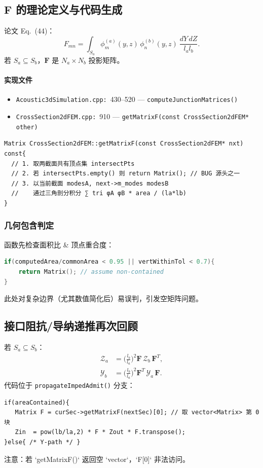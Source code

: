 \documentclass{ctexart}
\begin{document}
\subsection{$\mathbf F$ 的理论定义与代码生成}
论文 Eq.~(44)：
\[F_{mn}=\int_{S_a}\phi_m^{(a)}(y,z)\,\phi_n^{(b)}(y,z)\ \frac{dY\,dZ}{l_a l_b}.
\]
若 $S_a\subseteq S_b$，$\mathbf F$ 是 $N_a\times N_b$ 投影矩阵。

\paragraph{实现文件}
\begin{itemize}
  \item \texttt{Acoustic3dSimulation.cpp:}~430--520 — \texttt{computeJunctionMatrices()}
  \item \texttt{CrossSection2dFEM.cpp:}~910 — \texttt{getMatrixF(const CrossSection2dFEM* other)}
\end{itemize}

\begin{lstlisting}[caption={getMatrixF 核心片段},label={lst:Fcompute}]
Matrix CrossSection2dFEM::getMatrixF(const CrossSection2dFEM* nxt) const{
  // 1. 取两截面共有顶点集 intersectPts
  // 2. 若 intersectPts.empty() 则 return Matrix(); // BUG 源头之一
  // 3. 以当前截面 modesA, next->m_modes modesB
  //    通过三角剖分积分 ∑ tri φA φB * area / (la*lb)
}
\end{lstlisting}

\subsubsection{几何包含判定}
函数先检查面积比 \& 顶点重合度：
\begin{lstlisting}[caption={containCheck()},language=C++,label={lst:contain}]
if(computedArea/commonArea < 0.95 || vertWithinTol < 0.7){
    return Matrix(); // assume non-contained
}
\end{lstlisting}
此处对复杂边界（尤其数值简化后）易误判，引发空矩阵问题。

\subsection{接口阻抗/导纳递推再次回顾}
若 $S_a\subseteq S_b$：
\begin{align}
\mathcal Z_a &= \bigl(\tfrac{l_b}{l_a}\bigr)^2 \mathbf F\,\mathcal Z_b\,\mathbf F^{T},\\
\mathcal Y_b &= \bigl(\tfrac{l_b}{l_a}\bigr)^2 \mathbf F^{T}\,\mathcal Y_a\,\mathbf F.
\end{align}
代码位于 \texttt{propagateImpedAdmit()} 分支：
\begin{lstlisting}[caption={接口递推代码},label={lst:Zupdate}]
if(areaContained){
   Matrix F = curSec->getMatrixF(nextSec)[0]; // 取 vector<Matrix> 第 0 块
   Zin  = pow(lb/la,2) * F * Zout * F.transpose();
}else{ /* Y-path */ }
\end{lstlisting}
注意：若 `getMatrixF()` 返回空 `vector`，`F[0]` 非法访问。
\end{document}

